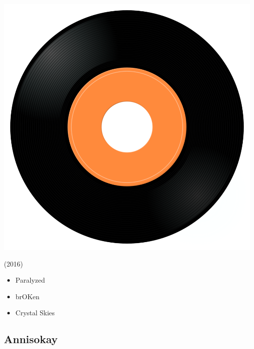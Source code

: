 \begin{minipage}[t]{0.25\textwidth}
\captionsetup{type=figure}
\includegraphics[width=\textwidth]{Images/cover.png}
\caption*{(2016)}
\end{minipage}
\begin{minipage}[t]{0.25\textwidth}\vspace{0pt}
\begin{itemize}[nosep,leftmargin=1em,labelwidth=*,align=left]
	\setlength{\itemsep}{0pt}
	\item Paralyzed
	\item brOKen
	\item Crystal Skies
\end{itemize}
\end{minipage}

\subsection{Annisokay}

